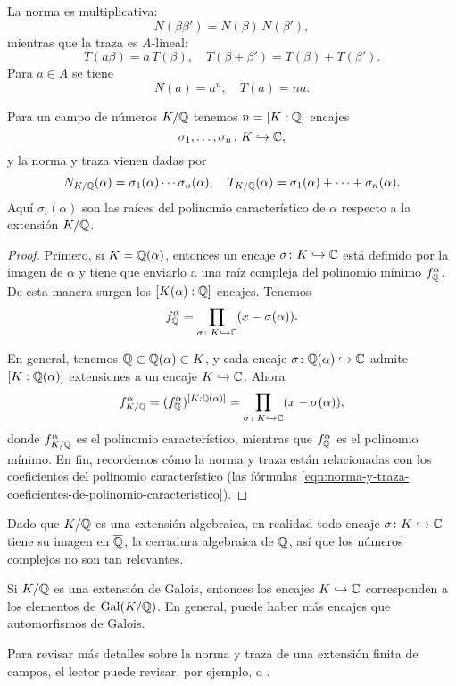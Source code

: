 La norma es multiplicativa:
$$N (\beta \beta') = N (\beta)\,N(\beta'),$$
mientras que la traza es $A$-lineal:
\[ T (a \beta) = a \, T (\beta), \quad
   T (\beta+\beta') = T (\beta) + T (\beta'). \]
Para $a \in A$ se tiene
$$N (a) = a^n, \quad T (a) = na.$$

\begin{proposicion}
  Para un campo de números $K/\mathbb{Q}$ tenemos $n = [K : \mathbb{Q}]$ encajes
  $$\sigma_1,\ldots,\sigma_n\colon K \hookrightarrow \mathbb{C},$$
  y la norma y traza vienen dadas por
  \[ N_{K/\mathbb{Q}} (\alpha) = \sigma_1 (\alpha) \cdots \sigma_n (\alpha), \quad
     T_{K/\mathbb{Q}} (\alpha) = \sigma_1 (\alpha) + \cdots + \sigma_n (\alpha). \]
  Aquí $\sigma_i (\alpha)$ son las raíces del polinomio característico
  de $\alpha$ respecto a la extensión $K/\mathbb{Q}$.

  \begin{proof}
    Primero, si $K = \mathbb{Q} (\alpha)$, entonces un encaje
    $\sigma\colon K \hookrightarrow \mathbb{C}$ está definido por la imagen de
    $\alpha$ y tiene que enviarlo a una raíz compleja del polinomio
    mínimo $f_{\mathbb{Q}}^\alpha$. De esta manera surgen los
    $[K (\alpha) : \mathbb{Q}]$ encajes. Tenemos
    \[ f_{\mathbb{Q}}^\alpha =
       \prod_{\sigma\colon K\hookrightarrow \mathbb{C}} (x - \sigma (\alpha)). \]

    En general, tenemos $\mathbb{Q} \subset \mathbb{Q} (\alpha) \subset K$, y cada
    encaje $\sigma\colon \mathbb{Q} (\alpha) \hookrightarrow \mathbb{C}$ admite
    $[K : \mathbb{Q} (\alpha)]$ extensiones a un encaje $K \hookrightarrow \mathbb{C}$.
    Ahora
    \[ f^\alpha_{K/\mathbb{Q}} = (f^\alpha_{\mathbb{Q}})^{[K : \mathbb{Q} (\alpha)]} =
       \prod_{\sigma\colon K\hookrightarrow \mathbb{C}} (x - \sigma (\alpha)), \]
    donde $f^\alpha_{K/\mathbb{Q}}$ es el polinomio característico, mientras que
    $f^\alpha_{\mathbb{Q}}$ es el polinomio mínimo.
    En fin, recordemos cómo la norma y traza están relacionadas con los
    coeficientes del polinomio característico (las fórmulas
    \eqref{eqn:norma-y-traza-coeficientes-de-polinomio-caracteristico}).
  \end{proof}
\end{proposicion}

\begin{comentario}
  Dado que $K/\mathbb{Q}$ es una extensión algebraica, en realidad todo encaje
  $\sigma\colon K \hookrightarrow \mathbb{C}$ tiene su imagen en $\overline{\mathbb{Q}}$,
  la cerradura algebraica de $\mathbb{Q}$, así que los números complejos no son
  tan relevantes.

  Si $K/\mathbb{Q}$ es una extensión de Galois, entonces los encajes
  $K \hookrightarrow \mathbb{C}$ corresponden a los elementos de $\operatorname{Gal} (K/\mathbb{Q})$.
  En general, puede haber más encajes que automorfismos de Galois.

  Para revisar más detalles sobre la norma y traza de una extensión finita de
  campos, el lector puede revisar, por ejemplo,
  \cite[\S II.8]{Morandi-GTM167} o \cite[\S VI.5]{Lang-Algebra}.
\end{comentario}


